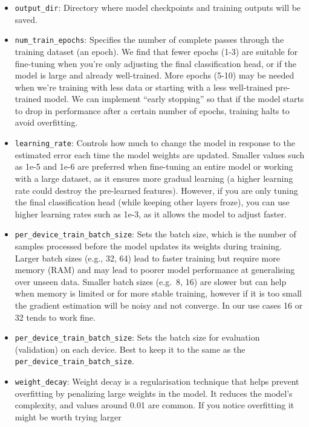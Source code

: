 \documentclass[
  letterpaper,
  DIV=11,
  numbers=noendperiod]{scrreprt}
\providecommand{\tightlist}{%
  \setlength{\itemsep}{0pt}\setlength{\parskip}{0pt}}\usepackage{longtable,booktabs,array}
\begin{document}
\begin{itemize}
\tightlist
\item
  \texttt{output\_dir}: Directory where model checkpoints and training
  outputs will be saved.
\item
  \texttt{num\_train\_epochs}: Specifies the number of complete passes
  through the training dataset (an epoch). We find that fewer epochs
  (1-3) are suitable for fine-tuning when you're only adjusting the
  final classification head, or if the model is large and already
  well-trained. More epochs (5-10) may be needed when we're training
  with less data or starting with a less well-trained pre-trained model.
  We can implement ``early stopping'' so that if the model starts to
  drop in performance after a certain number of epochs, training halts
  to avoid overfitting.
\item
  \texttt{learning\_rate}: Controls how much to change the model in
  response to the estimated error each time the model weights are
  updated. Smaller values such as 1e-5 and 1e-6 are preferred when
  fine-tuning an entire model or working with a large dataset, as it
  ensures more gradual learning (a higher learning rate could destroy
  the pre-learned features). However, if you are only tuning the final
  classification head (while keeping other layers froze), you can use
  higher learning rates such as 1e-3, as it allows the model to adjust
  faster.
\item
  \texttt{per\_device\_train\_batch\_size}: Sets the batch size, which
  is the number of samples processed before the model updates its
  weights during training. Larger batch sizes (e.g., 32, 64) lead to
  faster training but require more memory (RAM) and may lead to poorer
  model performance at generalising over unseen data. Smaller batch
  sizes (e.g.~8, 16) are slower but can help when memory is limited or
  for more stable training, however if it is too small the gradient
  estimation will be noisy and not converge. In our use cases 16 or 32
  tends to work fine.
\item
  \texttt{per\_device\_train\_batch\_size}: Sets the batch size for
  evaluation (validation) on each device. Best to keep it to the same as
  the \texttt{per\_device\_train\_batch\_size}.
\item
  \texttt{weight\_decay}: Weight decay is a regularisation technique
  that helps prevent overfitting by penalizing large weights in the
  model. It reduces the model's complexity, and values around 0.01 are
  common. If you notice overfitting it might be worth trying larger

\end{itemize}
\end{document}
